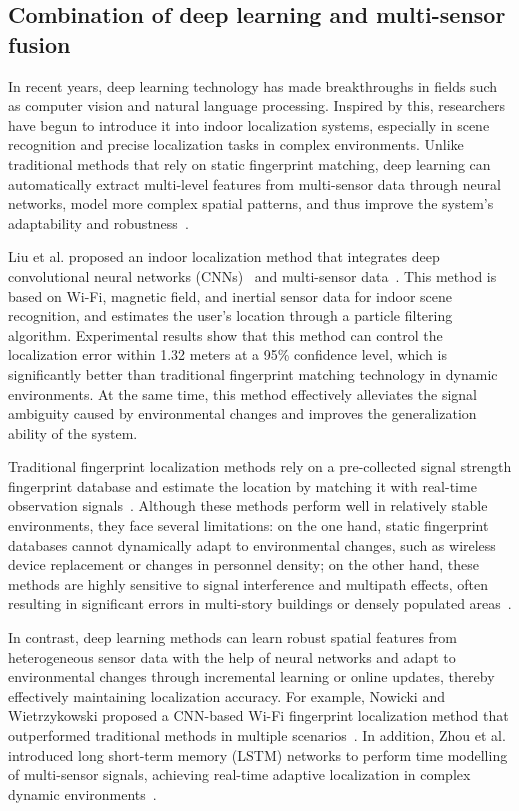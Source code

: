 \documentclass[12pt,a4paper]{article}
\numberwithin{equation}{section}
\begin{document}
\subsection{Combination of deep learning and multi-sensor fusion}
In recent years, deep learning technology has made breakthroughs in fields such
as computer vision and natural language processing. Inspired by this,
researchers have begun to introduce it into indoor localization systems,
especially in scene recognition and precise localization tasks in complex
environments. Unlike traditional methods that rely on static fingerprint
matching, deep learning can automatically extract multi-level features from
multi-sensor data through neural networks, model more complex spatial patterns,
and thus improve the system's adaptability and robustness~\cite{s151229867,
  nowicki2017ml}.

Liu et al. proposed an indoor localization method that integrates deep
convolutional neural networks (CNNs)~ and multi-sensor data~\cite{s151229867}. This method is based on
Wi-Fi, magnetic field, and inertial sensor data for indoor scene recognition,
and estimates the user's location through a particle filtering
algorithm. Experimental results show that this method can control the
localization error within 1.32 meters at a 95\% confidence level, which is
significantly better than traditional fingerprint matching technology in dynamic
environments. At the same time, this method effectively alleviates the signal
ambiguity caused by environmental changes and improves the generalization
ability of the system.

Traditional fingerprint localization methods rely on a pre-collected signal
strength fingerprint database and estimate the location by matching it with
real-time observation signals~\cite{ijgi6050135}. Although these methods perform
well in relatively stable environments, they face several limitations: on the
one hand, static fingerprint databases cannot dynamically adapt to environmental
changes, such as wireless device replacement or changes in personnel density; on
the other hand, these methods are highly sensitive to signal interference and
multipath effects, often resulting in significant errors in multi-story
buildings or densely populated areas~\cite{zou2022magloc}.

In contrast, deep learning methods can learn robust spatial features from
heterogeneous sensor data with the help of neural networks and adapt to
environmental changes through incremental learning or online updates, thereby
effectively maintaining localization accuracy. For example, Nowicki and
Wietrzykowski proposed a CNN-based Wi-Fi fingerprint localization method that
outperformed traditional methods in multiple scenarios~\cite{nowicki2017ml}. In
addition, Zhou et al. introduced long short-term memory (LSTM) networks to
perform time modelling of multi-sensor signals, achieving real-time adaptive
localization in complex dynamic environments~\cite{zhou2022deep}.
\end{document}
